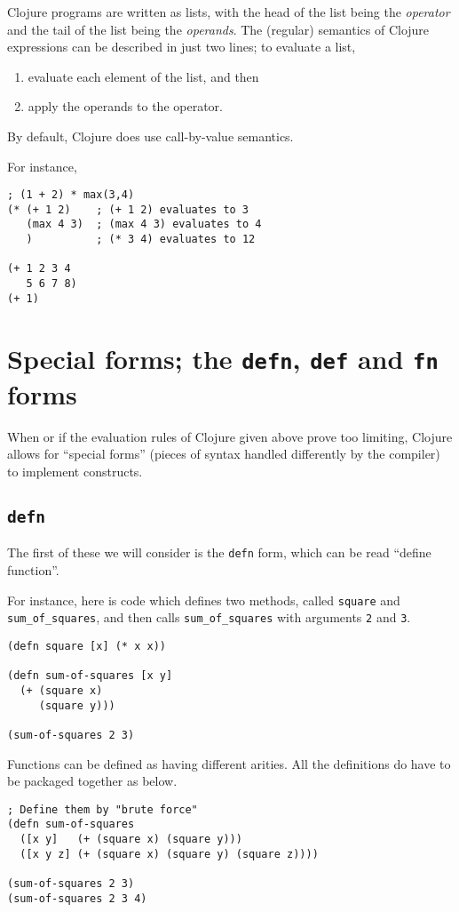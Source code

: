 \documentclass[11pt]{article}
\begin{document}
Clojure programs are written as lists,
with the head of the list being the \emph{operator} and
the tail of the list being the \emph{operands}.
The (regular) semantics of Clojure expressions
can be described in just two lines;
to evaluate a list,
\begin{enumerate}
\item evaluate each element of the list, and then
\item apply the operands to the operator.
\end{enumerate}
By default, Clojure does use call-by-value semantics.

For instance,
\begin{verbatim}
; (1 + 2) * max(3,4)
(* (+ 1 2)    ; (+ 1 2) evaluates to 3
   (max 4 3)  ; (max 4 3) evaluates to 4
   )          ; (* 3 4) evaluates to 12

(+ 1 2 3 4
   5 6 7 8)
(+ 1)
\end{verbatim}

\section{Special forms; the \texttt{defn}, \texttt{def} and \texttt{fn} forms}
\label{sec:org9f5b001}
When or if the evaluation rules of Clojure given above
prove too limiting, Clojure allows for “special forms”
(pieces of syntax handled differently by the compiler)
to implement constructs.

\subsection{\texttt{defn}}
\label{sec:orgaf65590}
The first of these we will consider is the \texttt{defn} form,
which can be read “define function”.

For instance, here is code which defines two methods,
called \texttt{square} and \texttt{sum\_of\_squares},
and then calls \texttt{sum\_of\_squares} with arguments \texttt{2} and \texttt{3}.
\begin{verbatim}
(defn square [x] (* x x))

(defn sum-of-squares [x y]
  (+ (square x)
     (square y)))

(sum-of-squares 2 3)
\end{verbatim}

Functions can be defined as having different arities.
All the definitions do have to be packaged together as below.
\begin{verbatim}
; Define them by "brute force" 
(defn sum-of-squares
  ([x y]   (+ (square x) (square y)))
  ([x y z] (+ (square x) (square y) (square z))))

(sum-of-squares 2 3)
(sum-of-squares 2 3 4)
\end{verbatim}
\end{document}
